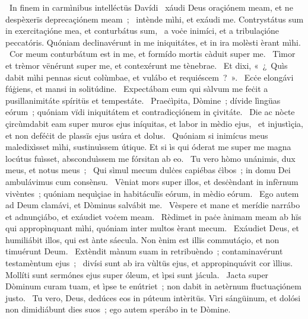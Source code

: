 {~In finem in carmìnibus intelléctüs Davídi}
{%
~xáudi Deus oraçiónem meam, et ne despèxerïs deprecaçiónem meam~;
~intènde mìhi, et exáudi me. Contrystátus sum in exercitaçióne mea, et conturbátus sum,
~a voċe inimíci, et a tribulaçióne peccatóris. Quóniam declinavérunt in me iniquitátes, et in ira molèsti èrant mìhi.
~Cor meum conturbátum est in me, et formído mortis càduit super me.
~Tìmor et trèmor vënérunt super me, et contexérunt me tènebrae.
~Et dixi, «~¿~Quìs dabit mìhi pennas sicut colùmbae, et vulábo et requiéscem~?~».
~Ecċe elongávi fúġiens, et mansi in solitúdine.
~Expectábam eum qui sàlvum me feċit a pusillanimitáte spíritüs et tempestáte.
~Praeċìpita, Dòmine~; dívide lìngüas eórum~; quóniam vïdi iniquitátem et contradicçiónem in çivitáte.
~Die ac nòcte çircùmdabit eam super muros ejus iníquitas, et labor in mèdio ejus,
~et injustìçia, et non deféċit de plassïs ejus usúra et dolus.
~Quóniam si inimícus meus maledixìsset mìhi, sustinuìssem útique. Et si ìs qui óderat me super me magna locútus fuìsset, absconduìssem me fórsitan ab eo.
~Tu vero hòmo unánimis, dux meus, et notus meus~;
~Qui sìmul mecum dulċes capiébas ċìbos~; in domu Dei ambulávimus cum consènsu.
~Vèniat mors super illos, et desċèndant in infèrnum vivèntes~; quóniam nequìçiae in habitáculïs eórum, in mèdio eórum.
~Ego autem ad Deum clamávi, et Dòminus salvábit me.
~Vèspere et mane et merídie narrábo et adnunçiábo, et exáudiet voċem meam.
~Rèdimet in paċe ànimam meam ab hïs qui appropìnquant mìhi, quóniam inter multos èrant mecum.
~Exáudiet Deus, et humiliábit illos, qui est ànte sáecula. Non ènim est illïs commutáçio, et non timuérunt Deum.
~Extèndit mànum suam in retribuèndo~; contaminavérunt testamèntum ejus~;
~divísi sunt ab ira vùltüs ejus, et appropinquávit cor ìllius. Mollíti sunt sermónes ejus super óleum, et ìpsi sunt jácula.
~Jacta super Dòminum curam tuam, et ìpse te enútriet~; non dabit in aetèrnum fluctuaçiónem justo.
~Tu vero, Deus, dedúces eos in púteum intèritüs. Vìri sángüinum, et dolósi non dimidiábunt dies suos~; ego autem sperábo in te Dòmine.
}
